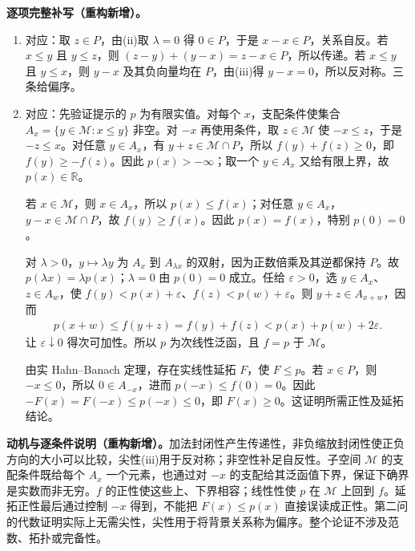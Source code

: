 \documentclass[../../main.tex]{subfiles}
\begin{document}
\begin{solution}
\textbf{逐项完整补写（重构新增）。}
\begin{enumerate}
\item 对应：取 $z\in P$，由(ii)取 $\lambda=0$ 得 $0\in P$，于是 $x-x\in P$，关系自反。若 $x\le y$ 且 $y\le z$，则 $(z-y)+(y-x)=z-x\in P$，所以传递。若 $x\le y$ 且 $y\le x$，则 $y-x$ 及其负向量均在 $P$，由(iii)得 $y-x=0$，所以反对称。三条给偏序。
\item 对应：先验证提示的 $p$ 为有限实值。对每个 $x$，支配条件使集合 $A_x=\{y\in\mathcal M:x\le y\}$ 非空。对 $-x$ 再使用条件，取 $z\in\mathcal M$ 使 $-x\le z$，于是 $-z\le x$。对任意 $y\in A_x$，有 $y+z\in\mathcal M\cap P$，所以 $f(y)+f(z)\ge0$，即 $f(y)\ge-f(z)$。因此 $p(x)>-\infty$；取一个 $y\in A_x$ 又给有限上界，故 $p(x)\in\mathbb R$。

若 $x\in\mathcal M$，则 $x\in A_x$，所以 $p(x)\le f(x)$；对任意 $y\in A_x$，$y-x\in\mathcal M\cap P$，故 $f(y)\ge f(x)$。因此 $p(x)=f(x)$，特别 $p(0)=0$。

对 $\lambda>0$，$y\mapsto\lambda y$ 为 $A_x$ 到 $A_{\lambda x}$ 的双射，因为正数倍乘及其逆都保持 $P$。故 $p(\lambda x)=\lambda p(x)$；$\lambda=0$ 由 $p(0)=0$ 成立。任给 $\varepsilon>0$，选 $y\in A_x$、$z\in A_w$，使 $f(y)<p(x)+\varepsilon$、$f(z)<p(w)+\varepsilon$。则 $y+z\in A_{x+w}$，因而
\begin{align*}
p(x+w)\le f(y+z)=f(y)+f(z)<p(x)+p(w)+2\varepsilon.
\end{align*}
让 $\varepsilon\downarrow0$ 得次可加性。所以 $p$ 为次线性泛函，且 $f=p$ 于 $\mathcal M$。

由实 Hahn--Banach 定理，存在实线性延拓 $F$，使 $F\le p$。若 $x\in P$，则 $-x\le0$，所以 $0\in A_{-x}$，进而 $p(-x)\le f(0)=0$。因此 $-F(x)=F(-x)\le p(-x)\le0$，即 $F(x)\ge0$。这证明所需正性及延拓结论。
\end{enumerate}
\end{solution}
\begin{remark}
\textbf{动机与逐条件说明（重构新增）。}加法封闭性产生传递性，非负缩放封闭性使正负方向的大小可以比较，尖性(iii)用于反对称；非空性补足自反性。子空间 $\mathcal M$ 的支配条件既给每个 $A_x$ 一个元素，也通过对 $-x$ 的支配给其泛函值下界，保证下确界是实数而非无穷。$f$ 的正性使这些上、下界相容；线性性使 $p$ 在 $\mathcal M$ 上回到 $f$。延拓正性最后通过控制 $-x$ 得到，不能把 $F(x)\le p(x)$ 直接误读成正性。第二问的代数证明实际上无需尖性，尖性用于将背景关系称为偏序。整个论证不涉及范数、拓扑或完备性。
\end{remark}
\end{document}
